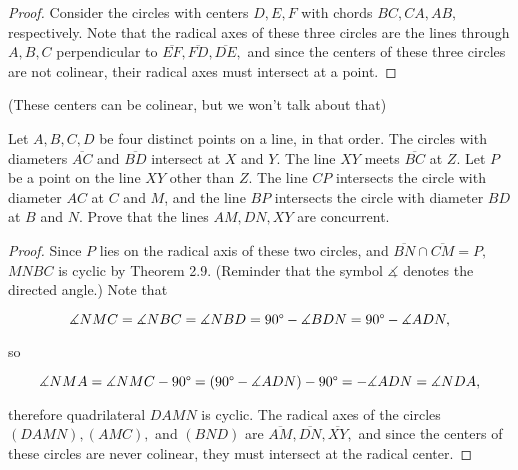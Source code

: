 \documentclass[letterpaper,oneside]{scrartcl}
\begin{document}
\begin{proof}  Consider the circles with centers $D,E,F$ with chords $BC, CA, AB,$ respectively. Note that the radical axes of these three circles are the lines through $A,B,C$ perpendicular to $\overline{EF}, \overline{FD}, \overline{DE},$ and since the centers of these three circles are not colinear, their radical axes must intersect at a point. \end{proof} (These centers  can  be colinear, but we won't talk about that)

\begin{problem*}
  [2.31, IMO 1995/1]
  Let  $A, B, C, D$ be four distinct points on a line, in that order. The circles with diameters $\overline{AC}$ and $\overline{BD}$ intersect at $X$ and $Y.$ The line $XY$ meets $\overline{BC}$ at $Z.$ Let $P$ be a point on the line $XY$ other than $Z$. The line $CP$ intersects the circle with diameter $AC$ at $C$ and $M$, and the line $BP$ intersects the circle with diameter $BD$ at $B$ and $N$. Prove that the lines $AM, DN, XY$ are concurrent.
\end{problem*}

\begin{proof}  Since $P$ lies on the radical axis of these two circles, and $\overline{BN} \cap \overline{CM} =P,$ $MNBC$ is cyclic by Theorem 2.9. (Reminder that the symbol $\measuredangle$ denotes the directed angle.) Note that

  $$\measuredangle NMC = \measuredangle NBC = \measuredangle NBD = 90\degree - \measuredangle BDN =  90\degree - \measuredangle ADN,$$

  so

  $$\measuredangle NMA =   \measuredangle NMC -90\degree = (90\degree - \measuredangle ADN) - 90\degree = -\measuredangle ADN = \measuredangle NDA,$$

  therefore quadrilateral $DAMN$ is cyclic. The radical axes of the circles $(DAMN), (AMC),$ and $(BND)$ are $\overline{AM}, \overline{DN}, \overline{XY},$ and since the centers of these circles are never colinear, they must intersect at the radical center.
\end{proof}
\end{document}
